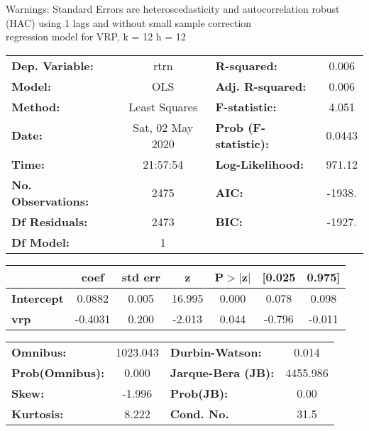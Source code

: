 Warnings: \newline
 [1] Standard Errors are heteroscedasticity and autocorrelation robust (HAC) using 1 lags and without small sample correction\\ 

regression model for VRP, k = 12 h = 12\begin{center}
\begin{tabular}{lclc}
\toprule
\textbf{Dep. Variable:}    &       rtrn       & \textbf{  R-squared:         } &     0.006   \\
\textbf{Model:}            &       OLS        & \textbf{  Adj. R-squared:    } &     0.006   \\
\textbf{Method:}           &  Least Squares   & \textbf{  F-statistic:       } &     4.051   \\
\textbf{Date:}             & Sat, 02 May 2020 & \textbf{  Prob (F-statistic):} &   0.0443    \\
\textbf{Time:}             &     21:57:54     & \textbf{  Log-Likelihood:    } &    971.12   \\
\textbf{No. Observations:} &        2475      & \textbf{  AIC:               } &    -1938.   \\
\textbf{Df Residuals:}     &        2473      & \textbf{  BIC:               } &    -1927.   \\
\textbf{Df Model:}         &           1      & \textbf{                     } &             \\
\bottomrule
\end{tabular}
\begin{tabular}{lcccccc}
                   & \textbf{coef} & \textbf{std err} & \textbf{z} & \textbf{P$> |$z$|$} & \textbf{[0.025} & \textbf{0.975]}  \\
\midrule
\textbf{Intercept} &       0.0882  &        0.005     &    16.995  &         0.000        &        0.078    &        0.098     \\
\textbf{vrp}       &      -0.4031  &        0.200     &    -2.013  &         0.044        &       -0.796    &       -0.011     \\
\bottomrule
\end{tabular}
\begin{tabular}{lclc}
\textbf{Omnibus:}       & 1023.043 & \textbf{  Durbin-Watson:     } &    0.014  \\
\textbf{Prob(Omnibus):} &   0.000  & \textbf{  Jarque-Bera (JB):  } & 4455.986  \\
\textbf{Skew:}          &  -1.996  & \textbf{  Prob(JB):          } &     0.00  \\
\textbf{Kurtosis:}      &   8.222  & \textbf{  Cond. No.          } &     31.5  \\
\bottomrule
\end{tabular}
\end{center}

